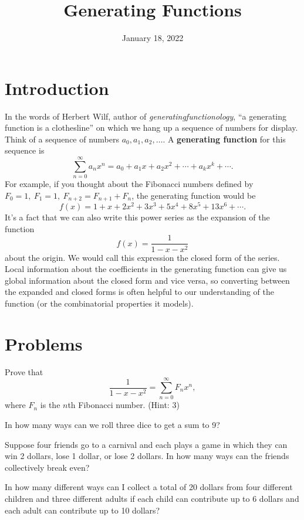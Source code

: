 \documentclass{article}
\title{Generating Functions}
\author{}
\date{January 18, 2022}
\begin{document}
\section{Introduction}

In the words of Herbert Wilf, author of \textit{generatingfunctionology}, ``a generating function is a clothesline'' on which we hang up a sequence of numbers for display.
Think of a sequence of numbers \(a_0,a_1,a_2,\ldots\).
A \textbf{generating function} for this sequence is 
\[\sum_{n=0}^\infty a_n x^n = a_0 + a_1x + a_2x^2 + \cdots + a_k x^k + \cdots.\]
For example, if you thought about the Fibonacci numbers defined by \(F_0=1,\ F_1=1,\ F_{n+2}=F_{n+1}+F_n\), the generating function would be 
\[f(x) = 1 + x + 2x^2 + 3x^3 + 5x^4 + 8x^5 + 13x^6 + \cdots.\]
It's a fact that we can also write this power series as the expansion of the function
\[f(x) = \frac{1}{1-x-x^2}\]
about the origin.
We would call this expression the closed form of the series.
Local information about the coefficients in the generating function can give us global information about the closed form and vice versa, so converting between the expanded and closed forms is often helpful to our understanding of the function (or the combinatorial properties it models).

\section{Problems}

\begin{exercise}
Prove that 
\[\frac{1}{1-x-x^2} = \sum_{n=0}^\infty F_n x^n,\]
where \(F_n\) is the \(n\)th Fibonacci number. (Hint: 3)
\end{exercise}

\begin{exercise}
In how many ways can we roll three dice to get a sum to 9?
\end{exercise}

\begin{exercise}
Suppose four friends go to a carnival and each plays a game in which they can win 2 dollars, lose 1 dollar, or lose 2 dollars.
In how many ways can the friends collectively break even?
\end{exercise}

\begin{exercise}
In how many different ways can I collect a total of 20 dollars from four different children and three different adults if each child can contribute up to 6 dollars and each adult can contribute up to 10 dollars?
\end{exercise}
\end{document}
